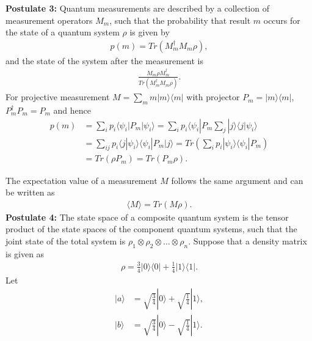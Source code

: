 \documentclass{beamer}
\begin{document}
\begin{frame}
\justify
\textbf{Postulate 3:} Quantum measurements are described by a collection of measurement operators $M_m$, such that the probability that result $m$ occurs for the state of a quantum system $\rho$ is given by
\begin{align}
p(m) = Tr(M^\dagger_m M_m \rho),
\end{align}
and the state of the system after the measurement is
\begin{align}
\frac{M_m \rho M^\dagger_m}{Tr(M^\dagger_m M_m \rho)}.
\end{align}
\vfill
For projective measurement $M = \sum_m m |m\rangle \langle m|$ with projector $P_m = |m\rangle \langle m|$, $P_m^\dagger P_m = P_m$ and hence
\begin{align}
p(m) & = \sum_i p_i \langle\psi_i|P_m|\psi_i\rangle = \sum_i p_i \langle\psi_i|P_m \sum_j |j\rangle \langle j |\psi_i\rangle \nonumber \\
& = \sum_{ij} p_i \langle j |\psi_i\rangle \langle\psi_i|P_m |j\rangle = Tr \left(\sum_i p_i |\psi_i\rangle \langle\psi_i|P_m \right) \nonumber \\
& = Tr(\rho P_m) = Tr(P_m \rho).
\end{align}
\end{frame}

\begin{frame}
\justify
The expectation value of a measurement $M$ follows the same argument and can be written as
\begin{align}
\langle M \rangle = Tr(M \rho).
\end{align}
\vfill
\textbf{Postulate 4:} The state space of a composite quantum system is the tensor product of the state spaces of the component quantum systems, such that the joint state of the total system is $\rho_1 \otimes \rho_2 \otimes \ldots \otimes \rho_n$.
\vfill
Suppose that a density matrix is given as
\begin{align}
\rho = \frac{3}{4}|0\rangle \langle 0| + \frac{1}{4}|1\rangle \langle 1|.
\end{align}
\vfill
Let
\begin{align}
|a\rangle & = \sqrt{\frac{3}{4}} |0\rangle + \sqrt{\frac{1}{4}} |1\rangle, \\
|b\rangle & = \sqrt{\frac{3}{4}} |0\rangle - \sqrt{\frac{1}{4}} |1\rangle.
\end{align}
\end{frame}
\end{document}
